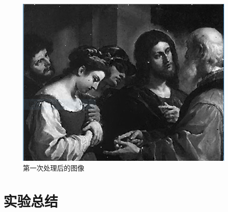 \documentclass[a4paper]{ctexrep}
\begin{document}
\begin{figure}
\centering
\includegraphics{img/processedImage1.PNG}
\caption{第一次处理后的图像}
\label{fig:firtProc}
\end{figure}

\section{实验总结}
\end{document}
